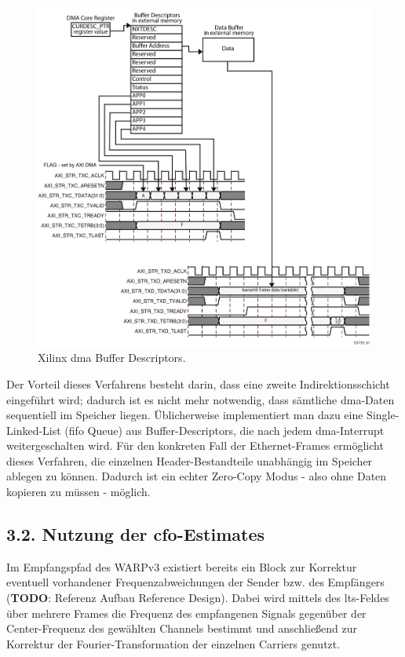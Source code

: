 \documentclass[ngerman,]{scrartcl}
\begin{document}
\begin{figure}
\centering
\includegraphics{ds759_axi_ethernet_075.png}
\caption{Xilinx \ac{dma} Buffer
Descriptors\autocite{xilinx-ethernet-core}.\label{fig:dma}}
\end{figure}

Der Vorteil dieses Verfahrens besteht darin, dass eine zweite
Indirektionsschicht eingeführt wird; dadurch ist es nicht mehr
notwendig, dass sämtliche \ac{dma}-Daten sequentiell im Speicher liegen.
Üblicherweise implementiert man dazu eine Single-Linked-List (\ac{fifo}
Queue) aus Buffer-Descriptors, die nach jedem \ac{dma}-Interrupt
weitergeschalten wird. Für den konkreten Fall der Ethernet-Frames
ermöglicht dieses Verfahren, die einzelnen Header-Bestandteile
unabhängig im Speicher ablegen zu können. Dadurch ist ein echter
Zero-Copy Modus - also ohne Daten kopieren zu müssen - möglich.

\subsection{\texorpdfstring{3.2. Nutzung der
\ac{cfo}-Estimates}{3.2. Nutzung der -Estimates}}\label{nutzung-der--estimates}

Im Empfangspfad des WARPv3 existiert bereits ein Block zur Korrektur
eventuell vorhandener Frequenzabweichungen der Sender bzw. des
Empfängers (\textbf{TODO}: Referenz Aufbau Reference Design). Dabei wird
mittels des \ac{lts}-Feldes über mehrere Frames die Frequenz des
empfangenen Signals gegenüber der Center-Frequenz des gewählten Channels
bestimmt und anschließend zur Korrektur der Fourier-Transformation der
einzelnen Carriers genutzt.
\end{document}
